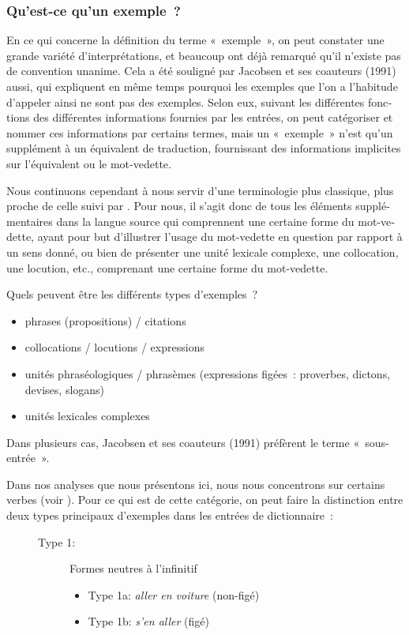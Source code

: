 \documentclass[output=paper,colorlinks,citecolor=brown,arabicfont,chinesefont,booklanguage=french]{langscibook}
\begin{document}
\begin{otherlanguage}{french}
\subsubsection{Qu’est-ce qu’un exemple~?}\label{sec:tillinger:2.2.1}

En ce qui concerne la définition du terme «~exemple~», on peut constater une grande variété d’interprétations, et beaucoup ont déjà remarqué qu’il n’existe pas de convention unanime. Cela a été souligné par Jacobsen et ses coauteurs (1991) aussi, qui expliquent en même temps pourquoi les exemples que l’on a l’habitude d’appeler ainsi ne sont pas des exemples. Selon eux, suivant les différentes fonctions des différentes informations fournies par les entrées, on peut catégoriser et nommer ces informations par certains termes, mais un «~exemple~» n’est qu’un supplément à un équivalent de traduction, fournissant des informations implicites sur l’équivalent ou le mot-vedette.

Nous continuons cependant à nous servir d’une terminologie plus classique, plus proche de celle suivi par \citet{Svensen2009}. Pour nous, il s’agit donc de tous les éléments supplémentaires dans la langue source qui comprennent une certaine forme du mot-vedette, ayant pour but d’illustrer l’usage du mot-vedette en question par rapport à un sens donné, ou bien de présenter une unité lexicale complexe, une collocation, une locution, etc., comprenant une certaine forme du mot-vedette.

Quels peuvent être les différents types d’exemples~?

\begin{itemize}
    \item phrases (propositions) / citations
    \item collocations / locutions / expressions
    \item unités phraséologiques / phrasèmes (expressions figées~: proverbes, dictons, devises, slogans)
    \item unités lexicales complexes
\end{itemize}

Dans plusieurs cas, Jacobsen et ses coauteurs (1991) préfèrent le terme «~sous-entrée~».

Dans nos analyses que nous présentons ici, nous nous concentrons sur certains verbes (voir ). Pour ce qui est de cette catégorie, on peut faire la distinction entre deux types principaux d’exemples dans les entrées de dictionnaire~:

\begin{figure}
\parbox{.8\textwidth}{\begin{description}
\item[Type 1:] Formes neutres à l'infinitif
\begin{itemize}[leftmargin=*]
\item Type 1a: \textit{aller en voiture} (non-figé)
\item Type 1b: \textit{s'en aller} (figé)
\end{itemize}


\end{description}}
\end{figure}
\end{otherlanguage}
\end{document}
